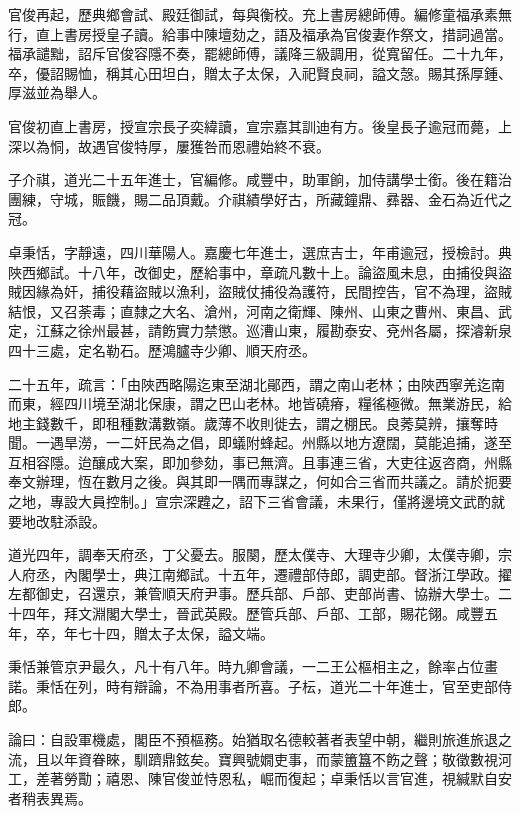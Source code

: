 \begin{pinyinscope}
官俊再起，歷典鄉會試、殿廷御試，每與衡校。充上書房總師傅。編修童福承素無行，直上書房授皇子讀。給事中陳壇劾之，語及福承為官俊妻作祭文，措詞過當。福承譴黜，詔斥官俊容隱不奏，罷總師傅，議降三級調用，從寬留任。二十九年，卒，優詔賜恤，稱其心田坦白，贈太子太保，入祀賢良祠，謚文愨。賜其孫厚鍾、厚滋並為舉人。

官俊初直上書房，授宣宗長子奕緯讀，宣宗嘉其訓迪有方。後皇長子逾冠而薨，上深以為恫，故遇官俊特厚，屢獲咎而恩禮始終不衰。

子介祺，道光二十五年進士，官編修。咸豐中，助軍餉，加侍講學士銜。後在籍治團練，守城，賑饑，賜二品頂戴。介祺績學好古，所藏鐘鼎、彞器、金石為近代之冠。

卓秉恬，字靜遠，四川華陽人。嘉慶七年進士，選庶吉士，年甫逾冠，授檢討。典陜西鄉試。十八年，改御史，歷給事中，章疏凡數十上。論盜風未息，由捕役與盜賊因緣為奸，捕役藉盜賊以漁利，盜賊仗捕役為護符，民間控告，官不為理，盜賊結恨，又召荼毒；直隸之大名、滄州，河南之衛輝、陳州、山東之曹州、東昌、武定，江蘇之徐州最甚，請飭實力禁懲。巡漕山東，履勘泰安、兗州各屬，探濬新泉四十三處，定名勒石。歷鴻臚寺少卿、順天府丞。

二十五年，疏言：「由陜西略陽迄東至湖北鄖西，謂之南山老林；由陜西寧羌迄南而東，經四川境至湖北保康，謂之巴山老林。地皆磽瘠，糧徭極微。無業游民，給地主錢數千，即租種數溝數嶺。歲薄不收則徙去，謂之棚民。良莠莫辨，攘奪時聞。一遇旱澇，一二奸民為之倡，即蟻附蜂起。州縣以地方遼闊，莫能追捕，遂至互相容隱。迨釀成大案，即加參劾，事已無濟。且事連三省，大吏往返咨商，州縣奉文辦理，恆在數月之後。與其即一隅而專謀之，何如合三省而共議之。請於扼要之地，專設大員控制。」宣宗深韙之，詔下三省會議，未果行，僅將邊境文武酌就要地改駐添設。

道光四年，調奉天府丞，丁父憂去。服闋，歷太僕寺、大理寺少卿，太僕寺卿，宗人府丞，內閣學士，典江南鄉試。十五年，遷禮部侍郎，調吏部。督浙江學政。擢左都御史，召還京，兼管順天府尹事。歷兵部、戶部、吏部尚書、協辦大學士。二十四年，拜文淵閣大學士，晉武英殿。歷管兵部、戶部、工部，賜花翎。咸豐五年，卒，年七十四，贈太子太保，謚文端。

秉恬兼管京尹最久，凡十有八年。時九卿會議，一二王公樞相主之，餘率占位畫諾。秉恬在列，時有辯論，不為用事者所喜。子枟，道光二十年進士，官至吏部侍郎。

論曰：自設軍機處，閣臣不預樞務。始猶取名德較著者表望中朝，繼則旅進旅退之流，且以年資眷睞，馴躋鼎鉉矣。寶興號嫺吏事，而蒙簠簋不飭之聲；敬徵數視河工，差著勞勩；禧恩、陳官俊並恃恩私，崛而復起；卓秉恬以言官進，視緘默自安者稍表異焉。


\end{pinyinscope}